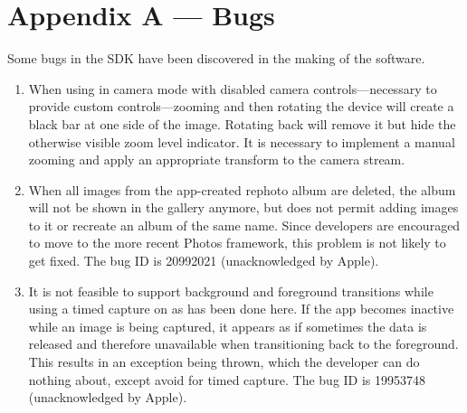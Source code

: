 \chapter{Appendix A --- Bugs}

Some bugs in the SDK have been discovered in the making of the software.
\begin{enumerate}

   \item When using  in camera mode with disabled
      camera controls---necessary to provide custom controls---zooming and then
      rotating the device will create a black bar at one side of the image.
      Rotating back will remove it but hide the otherwise visible zoom level
      indicator. It is necessary to implement a manual zooming and apply an
      appropriate transform to the camera stream.

   \item When all images from the app-created rephoto album are deleted, the
      album will not be shown in the gallery anymore, but 
      does not permit adding images to it or recreate an album of the same name.
      Since developers are encouraged to move to the more recent Photos
      framework, this problem is not likely to get fixed. The bug ID is
      20992021 (unacknowledged by Apple).

   \item It is not feasible to support background and foreground transitions
      while using a timed capture on  as has been
      done here. If the app becomes inactive while an image is being captured,
      it appears as if sometimes the data is released and therefore unavailable when
      transitioning back to the foreground. This results in an exception being
      thrown, which the developer can do nothing about, except avoid
       for timed capture. The bug ID is 19953748
      (unacknowledged by Apple).
\end{enumerate}
